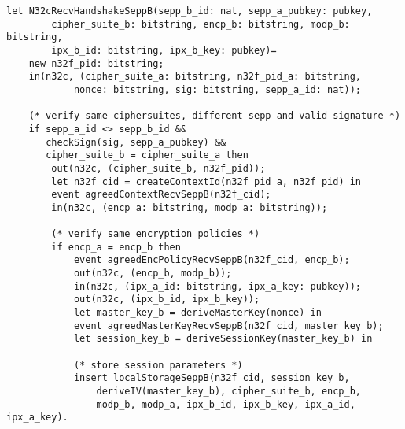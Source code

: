 \begin{lstlisting}
let N32cRecvHandshakeSeppB(sepp_b_id: nat, sepp_a_pubkey: pubkey,
        cipher_suite_b: bitstring, encp_b: bitstring, modp_b: bitstring,
        ipx_b_id: bitstring, ipx_b_key: pubkey)=
    new n32f_pid: bitstring;
    in(n32c, (cipher_suite_a: bitstring, n32f_pid_a: bitstring,
            nonce: bitstring, sig: bitstring, sepp_a_id: nat));

    (* verify same ciphersuites, different sepp and valid signature *)
    if sepp_a_id <> sepp_b_id &&
       checkSign(sig, sepp_a_pubkey) &&
       cipher_suite_b = cipher_suite_a then
        out(n32c, (cipher_suite_b, n32f_pid));
        let n32f_cid = createContextId(n32f_pid_a, n32f_pid) in
        event agreedContextRecvSeppB(n32f_cid);
        in(n32c, (encp_a: bitstring, modp_a: bitstring));

        (* verify same encryption policies *)
        if encp_a = encp_b then
            event agreedEncPolicyRecvSeppB(n32f_cid, encp_b);
            out(n32c, (encp_b, modp_b));
            in(n32c, (ipx_a_id: bitstring, ipx_a_key: pubkey));
            out(n32c, (ipx_b_id, ipx_b_key));
            let master_key_b = deriveMasterKey(nonce) in
            event agreedMasterKeyRecvSeppB(n32f_cid, master_key_b);
            let session_key_b = deriveSessionKey(master_key_b) in

            (* store session parameters *)
            insert localStorageSeppB(n32f_cid, session_key_b,
                deriveIV(master_key_b), cipher_suite_b, encp_b,
                modp_b, modp_a, ipx_b_id, ipx_b_key, ipx_a_id, ipx_a_key).
\end{lstlisting}